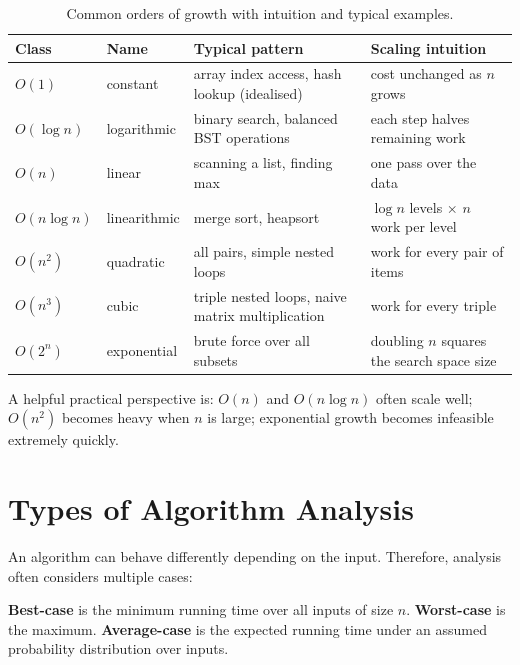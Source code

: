 \documentclass[12pt]{scrartcl}
\begin{document}
\begin{table}[h]
	\centering
	\caption{Common orders of growth with intuition and typical examples.}
	\begin{tabular}{@{}p{} p{} p{} p{}@{}}
		\toprule
		Class          & Name         & Typical pattern                                  & Scaling intuition                                 \\ \midrule
		\(O(1)\)       & constant     & array index access, hash lookup (idealised)      & cost unchanged as \(n\) grows                     \\
		\(O(\log n)\)  & logarithmic  & binary search, balanced BST operations           & each step halves remaining work                   \\
		\(O(n)\)       & linear       & scanning a list, finding max                     & one pass over the data                            \\
		\(O(n\log n)\) & linearithmic & merge sort, heapsort                             & \(\log n\) levels \(\times\) \(n\) work per level \\
		\(O(n^2)\)     & quadratic    & all pairs, simple nested loops                   & work for every pair of items                      \\
		\(O(n^3)\)     & cubic        & triple nested loops, naive matrix multiplication & work for every triple                             \\
		\(O(2^n)\)     & exponential  & brute force over all subsets                     & doubling \(n\) squares the search space size      \\ \bottomrule
	\end{tabular}
\end{table}

A helpful practical perspective is: \(O(n)\) and \(O(n\log n)\) often scale well; \(O(n^2)\) becomes heavy when \(n\) is large; exponential growth becomes infeasible extremely quickly.

\section{Types of Algorithm Analysis}
An algorithm can behave differently depending on the input. Therefore, analysis often considers multiple cases:

\textbf{Best-case} is the minimum running time over all inputs of size \(n\). \textbf{Worst-case} is the maximum. \textbf{Average-case} is the expected running time under an assumed probability distribution over inputs.
\end{document}
